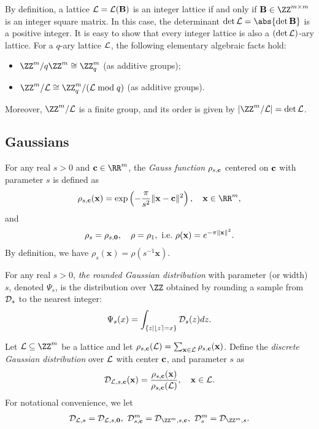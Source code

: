 \documentclass{fundam}
\begin{document}
By definition, a lattice $\mathcal{L} = \mathcal{L}(\mathbf{B})$ is an integer lattice if and only if $\vr{B} \in \ZZ^{m \times m}$ is an integer square matrix. In this case, the determinant $\det \Lat = \abs{\det{\vr{B}}}$ is a positive integer. It is easy to show that every integer lattice is also a $(\det \mathcal{L})$-ary lattice. 
For a $q$-ary lattice $\mathcal{L}$, the following elementary algebraic facts hold:
\begin{itemize}
	\item $\ZZ^{m} / q\ZZ^{m} \cong \ZZ_q^m$ (as additive groups);
	\item $\ZZ^{m} / \Lat \cong \ZZ_q^m / (\Lat \bmod q)$ (as additive groups).
\end{itemize}
Moreover, $\ZZ^{m} / \Lat$ is a finite group, and its order is given by $|\ZZ^{m} / \Lat| = \det \Lat$.

\subsection{Gaussians}\label{Gaussian}
For any real $s>0$ and $\vr{c}\in\RR^{m}$, the \emph{Gauss function} $\rho_{s,\mathbf{c}}$ centered on $\mathbf{c}$ with parameter $s$ is defined as
\begin{align*}
	\rho_{s,\vr{c}}(\vr{x})  = \exp \left(-\frac{\pi}{s^{2}}\|\vr{x} - \vr{c} \|^{2}\right), ~~~\vr{x}\in\RR^{m},
\end{align*}
and 
\begin{align*}
	\rho_{s} = \rho_{s, \mathbf{0}}, ~~~\rho = \rho_{1},~\text{i.e.}~ \rho(\mathbf{x}) = e^{-\pi\| \mathbf{x} \|^{2}}.  
\end{align*}
By definition, we have $\rho_s(\mathbf{x}) = \rho(s^{-1} \mathbf{x})$.


For any real $s>0$, \textit{the rounded Gaussian distribution} with parameter (or width) $s$, denoted $\Psi_{s}$, is the distribution over $\ZZ$ obtained by rounding a sample from $\mathcal{D}_{s}$ to the nearest integer:
\begin{align*}
	\Psi_{s}(x)= \int_{\{ z\mid \lfloor z \rceil = x\}} \mathcal{D}_{s}(z)dz.
\end{align*}

Let $\Lat\subseteq \ZZ^{m}$ be a lattice and let $\rho_{s, \mathbf{c}} (\mathcal{L}) = \sum_{\mathbf{x}\in \mathcal{L}} \rho_{s, \mathbf{c}}(\mathbf{x})$. Define the \emph{discrete Gaussian distribution} over $\mathcal{L}$ with center $\mathbf{c}$, and parameter $s$ as
\begin{align*}
	\mathcal{D}_{\mathcal{L}, s, \mathbf{c}} (\mathbf{x}) =  \frac{\rho_{s, \mathbf{c}}(\mathbf{x})}{\rho_{s, \mathbf{c}}(\mathcal{L})}, ~~~\mathbf{x}\in\mathcal{L}.
\end{align*}
For notational convenience, we let
\begin{align*}
	\Distr_{\Lat, s} = \Distr_{\Lat, s, \vr{0}}, ~ \Distr_{s, \vr{c}}^{m} = \Distr_{\ZZ^{m}, s, \vr{c}}, ~ \Distr_{s}^{m} = \Distr_{\ZZ^{m}, s}.
\end{align*}
\end{document}

